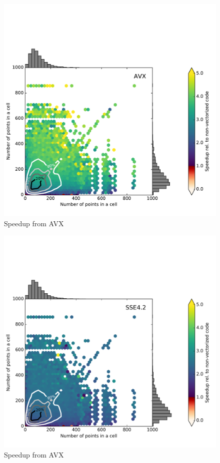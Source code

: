 \documentclass[preprint, 12pt, authoryear]{elsarticle}
\begin{document}
\begin{figure}[htbp]
\centering
\includegraphics[clip=true,scale=0.7]{wp_speedup_AVX}%
\caption{Speedup from AVX}
\label{fig:speedup_avx}
\end{figure}
\begin{figure}[htbp]
\centering
\includegraphics[clip=true,scale=0.7]{wp_speedup_SSE_4_2}
\caption{Speedup from AVX}
\label{fig:speedup_sse}
\end{figure}
\end{document}
